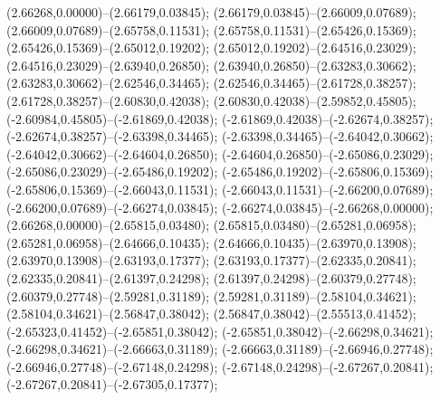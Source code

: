  (2.66268,0.00000)--(2.66179,0.03845);
 (2.66179,0.03845)--(2.66009,0.07689);
 (2.66009,0.07689)--(2.65758,0.11531);
 (2.65758,0.11531)--(2.65426,0.15369);
 (2.65426,0.15369)--(2.65012,0.19202);
 (2.65012,0.19202)--(2.64516,0.23029);
 (2.64516,0.23029)--(2.63940,0.26850);
 (2.63940,0.26850)--(2.63283,0.30662);
 (2.63283,0.30662)--(2.62546,0.34465);
 (2.62546,0.34465)--(2.61728,0.38257);
 (2.61728,0.38257)--(2.60830,0.42038);
 (2.60830,0.42038)--(2.59852,0.45805);
 (-2.60984,0.45805)--(-2.61869,0.42038);
 (-2.61869,0.42038)--(-2.62674,0.38257);
 (-2.62674,0.38257)--(-2.63398,0.34465);
 (-2.63398,0.34465)--(-2.64042,0.30662);
 (-2.64042,0.30662)--(-2.64604,0.26850);
 (-2.64604,0.26850)--(-2.65086,0.23029);
 (-2.65086,0.23029)--(-2.65486,0.19202);
 (-2.65486,0.19202)--(-2.65806,0.15369);
 (-2.65806,0.15369)--(-2.66043,0.11531);
 (-2.66043,0.11531)--(-2.66200,0.07689);
 (-2.66200,0.07689)--(-2.66274,0.03845);
 (-2.66274,0.03845)--(-2.66268,0.00000);
 (2.66268,0.00000)--(2.65815,0.03480);
 (2.65815,0.03480)--(2.65281,0.06958);
 (2.65281,0.06958)--(2.64666,0.10435);
 (2.64666,0.10435)--(2.63970,0.13908);
 (2.63970,0.13908)--(2.63193,0.17377);
 (2.63193,0.17377)--(2.62335,0.20841);
 (2.62335,0.20841)--(2.61397,0.24298);
 (2.61397,0.24298)--(2.60379,0.27748);
 (2.60379,0.27748)--(2.59281,0.31189);
 (2.59281,0.31189)--(2.58104,0.34621);
 (2.58104,0.34621)--(2.56847,0.38042);
 (2.56847,0.38042)--(2.55513,0.41452);
 (-2.65323,0.41452)--(-2.65851,0.38042);
 (-2.65851,0.38042)--(-2.66298,0.34621);
 (-2.66298,0.34621)--(-2.66663,0.31189);
 (-2.66663,0.31189)--(-2.66946,0.27748);
 (-2.66946,0.27748)--(-2.67148,0.24298);
 (-2.67148,0.24298)--(-2.67267,0.20841);
 (-2.67267,0.20841)--(-2.67305,0.17377);
